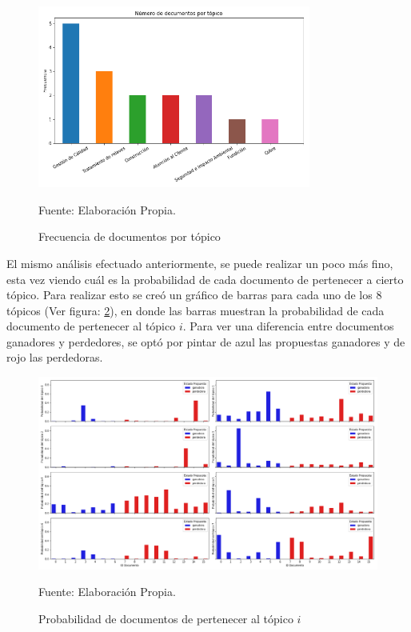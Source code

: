     \begin{figure}[H]
        \centering
        \includegraphics[width=0.8\textwidth]{figures/LDA/documents_per_topic.png}
        \caption{\label{fig:FreqperTopic} Frecuencia de documentos por tópico} Fuente: Elaboración Propia.
    \end{figure}
    
    El mismo análisis efectuado anteriormente, se puede realizar un poco más fino, esta vez viendo cuál es la probabilidad de cada documento de pertenecer a cierto tópico. Para realizar esto se creó un gráfico de barras para cada uno de los 8 tópicos (Ver figura: \ref{fig:TopicPerDoc}), en donde las barras muestran la probabilidad de cada documento de pertenecer al tópico $i$. Para ver una diferencia entre documentos ganadores y perdedores, se optó por pintar de azul las propuestas ganadores y de rojo las perdedoras.
    
    \begin{figure}[h!]
        \centering
        \includegraphics[width=1\textwidth]{figures/LDA/distribution.png}
        \caption{\label{fig:TopicPerDoc} Probabilidad de documentos de pertenecer al tópico $i$} Fuente: Elaboración Propia.
    \end{figure}
    
